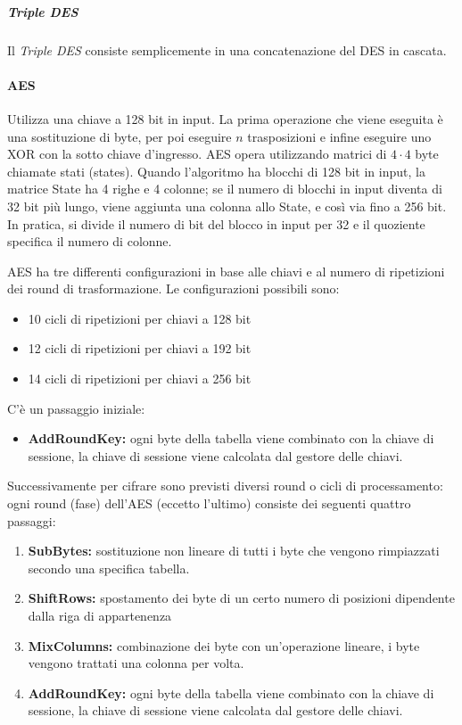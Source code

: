 \subparagraph*{Triple DES}

Il \textit{Triple DES} consiste semplicemente in una concatenazione del DES in 
cascata.

\paragraph{AES}

Utilizza una chiave a 128 bit in input. La prima operazione che viene eseguita è 
una sostituzione di byte, per poi eseguire $n$ trasposizioni e infine eseguire
uno XOR con la sotto chiave d'ingresso.
AES opera utilizzando matrici di $4\cdot4$ byte chiamate stati (states). Quando l'algoritmo ha blocchi di 128 bit in input, la matrice State ha 4 righe e 4 colonne; se il numero di blocchi in input diventa di 32 bit più lungo, viene aggiunta una colonna allo State, e così via fino a 256 bit. In pratica, si divide il numero di bit del blocco in input per 32 e il quoziente specifica il numero di colonne.

AES ha tre differenti configurazioni in base alle chiavi e al numero di 
ripetizioni dei round di trasformazione. Le configurazioni possibili sono:
\begin{itemize}
 \item 10 cicli di ripetizioni per chiavi a 128 bit
 \item 12 cicli di ripetizioni per chiavi a 192 bit
 \item 14 cicli di ripetizioni per chiavi a 256 bit
\end{itemize}


C'è un passaggio iniziale:
\begin{itemize}
\item \textbf{AddRoundKey:} ogni byte della tabella viene combinato con la chiave di sessione, la chiave di sessione viene calcolata dal gestore delle chiavi.
\end{itemize}


Successivamente per cifrare sono previsti diversi round o cicli di processamento: ogni round (fase) dell'AES (eccetto l'ultimo) consiste dei seguenti quattro passaggi:

\begin{enumerate}
\item \textbf{SubBytes:} sostituzione non lineare di tutti i byte che vengono rimpiazzati secondo una specifica tabella.
\item \textbf{ShiftRows:} spostamento dei byte di un certo numero di posizioni dipendente dalla riga di appartenenza
\item \textbf{MixColumns:} combinazione dei byte con un'operazione lineare, i byte vengono trattati una colonna per volta.
\item \textbf{AddRoundKey:} ogni byte della tabella viene combinato con la chiave di sessione, la chiave di sessione viene calcolata dal gestore delle chiavi.
\end{enumerate}


